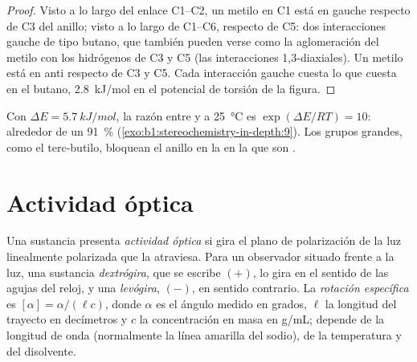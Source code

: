 \begin{proof}
Visto a lo largo del enlace C1--C2, un metilo  en C1 está en gauche
respecto de C3 del anillo; visto a lo largo de C1--C6, respecto de C5:
dos interacciones gauche de tipo butano, que también pueden verse como
la aglomeración del metilo con los hidrógenos  de C3 y C5 (las
interacciones 1,3-diaxiales). Un metilo  está en anti respecto
de C3 y C5. Cada interacción gauche cuesta lo que cuesta en el butano,
\qty{2.8}{kJ/mol} en el potencial de torsión de la figura.
\end{proof}

Con $\Delta E = \qty{5.7}{kJ/mol}$, la razón entre   y
 a \qty{25}{\celsius} es $\exp(\Delta E/RT) = 10$: alrededor de un
\qty{91}{\percent}  (\cref{exo:b1:stereochemistry-in-depth:9}).
Los grupos grandes, como el terc-butilo, bloquean el anillo en la 
en la que son .

\section{Actividad óptica}

\begin{definition}\label{def:b1:stereochemistry-in-depth:optical-activity}
Una sustancia presenta \emph{actividad óptica} si gira
el plano de polarización de la luz linealmente polarizada que la
atraviesa. Para un observador situado frente a la luz, una sustancia
\emph{dextrógira}, que se escribe $(+)$, lo gira en el sentido
de las agujas del reloj, y una \emph{levógira},
$(-)$, en sentido contrario. La \emph{rotación específica}
es $[\alpha] = \alpha/(\ell c)$, donde $\alpha$ es el ángulo medido en
grados, $\ell$ la longitud del trayecto en decímetros y $c$ la
concentración en masa en \unit{g/mL}; depende de la longitud de onda
(normalmente la línea amarilla del sodio), de la temperatura y del
disolvente.
\end{definition}

